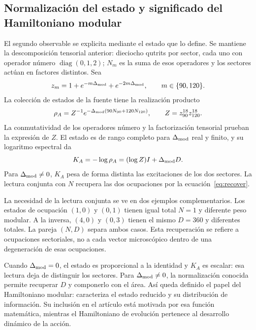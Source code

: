 \subsection{Normalización del estado y significado del Hamiltoniano modular}
El segundo observable se explicita mediante el estado que lo define.
Se mantiene la descomposición tensorial anterior: dieciocho qutrits
por sector, cada uno con operador número $\operatorname{diag}(0,1,2)$;
$N_m$ es la suma de esos operadores y los sectores actúan en factores
distintos. Sea
\[
 z_m=1+e^{-m\Delta_{\rm mod}}+e^{-2m\Delta_{\rm mod}},
 \qquad m\in\{90,120\}.
\]
La colección de estados de la fuente tiene la realización producto
\[
 \rho_A=Z^{-1}e^{-\Delta_{\rm mod}(90N_{90}+120N_{120})},
 \qquad Z=z_{90}^{18}z_{120}^{18}.
\]
La conmutatividad de los operadores número y la factorización tensorial
prueban la expresión de $Z$. El estado es de rango completo para
$\Delta_{\rm mod}$ real y finito, y su logaritmo espectral da
\[
 K_A=-\log\rho_A=(\log Z)I+\Delta_{\rm mod}D.
\]
Para $\Delta_{\rm mod}\ne0$, $K_A$ pesa de forma distinta las excitaciones
de los dos sectores. La lectura conjunta con $N$ recupera las dos ocupaciones
por la ecuación~\eqref{eq:recover}.

La necesidad de la lectura conjunta se ve en dos ejemplos complementarios.
Los estados de ocupación $(1,0)$ y $(0,1)$ tienen igual total $N=1$
y diferente peso modular. A la inversa, $(4,0)$ y $(0,3)$ tienen
el mismo $D=360$ y diferentes totales. La pareja $(N,D)$ separa ambos
casos. Esta recuperación se refiere a ocupaciones sectoriales, no a
cada vector microscópico dentro de una degeneración de esas ocupaciones.

Cuando $\Delta_{\rm mod}=0$, el estado es proporcional a la identidad
y $K_A$ es escalar: esa lectura deja de distinguir los sectores.
Para $\Delta_{\rm mod}\ne0$, la normalización conocida permite recuperar
$D$ y componerlo con el área. Así queda definido el papel del Hamiltoniano
modular: caracteriza el estado reducido y su distribución de información.
Su inclusión en el artículo está motivada por esa función matemática,
mientras el Hamiltoniano de evolución pertenece al desarrollo dinámico
de la acción.
